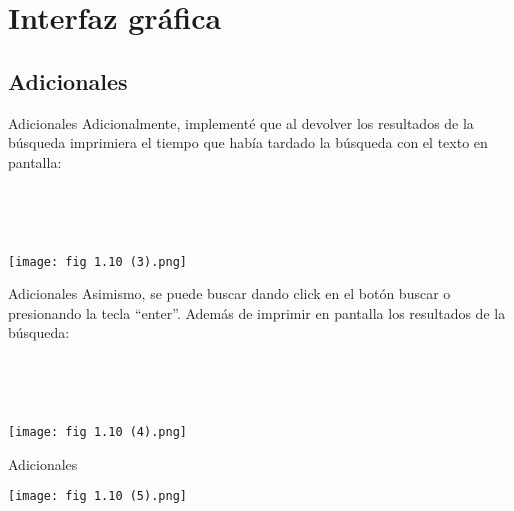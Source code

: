 \section{Interfaz gráfica}

\subsection{Adicionales}
\begin{frame}{Adicionales}
    Adicionalmente, implementé que al devolver los resultados de la búsqueda imprimiera el tiempo que había
tardado la búsqueda con el texto en pantalla:

\pause

\

\

\begin{center}
    \texttt{[image: fig 1.10 (3).png]}
\end{center}
\end{frame}

\begin{frame}{Adicionales}
    Asimismo, se puede buscar dando click en el botón buscar o presionando la tecla “enter”.
    Además de imprimir en pantalla los resultados de la búsqueda:

\pause

\

\

\begin{center}
    \texttt{[image: fig 1.10 (4).png]}
\end{center}
\end{frame}

\begin{frame}{Adicionales}
    \begin{center}
        \texttt{[image: fig 1.10 (5).png]}
    \end{center}
\end{frame}